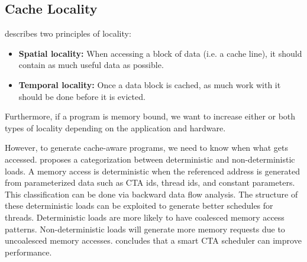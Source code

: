 \documentclass{article}
\begin{document}
\subsection{Cache Locality}
\citeauthor{meyer2003algorithms} describes two principles of locality\cite{meyer2003algorithms}:
\begin{itemize}
    \item \textbf{Spatial locality:} When accessing a block of data (i.e. a cache line), it should contain as much useful data as possible.
    \item \textbf{Temporal locality:} Once a data block is cached, as much work with it should be done before it is evicted.
\end{itemize}
Furthermore, if a program is memory bound, we want to increase either or both types of locality depending on the application and hardware.

However, to generate cache-aware programs, we need to know when what gets accessed.
\citet{koo2015revealing} proposes a categorization between deterministic and non-deterministic loads.
A memory access is deterministic when the referenced address is generated from parameterized data such as CTA ids, thread ids, and constant parameters.
This classification can be done via backward data flow analysis. The structure of these deterministic loads can be exploited to generate better schedules for threads.
Deterministic loads are more likely to have coalesced memory access patterns. 
Non-deterministic loads will generate more memory requests due to uncoalesced memory accesses.
\citet{koo2015revealing} concludes that a smart CTA scheduler can improve performance.
\end{document}
